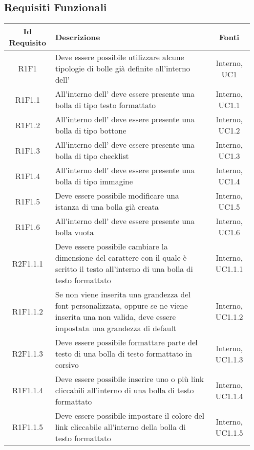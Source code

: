 \newpage
\subsection{Requisiti Funzionali}
\normalsize
\begingroup
\renewcommand\arraystretch{2}
\begin{longtable}{|c|>{\centering}m{7cm}|c|}
\hline
\textbf{Id Requisito} & \textbf{Descrizione} & \textbf{Fonti}\\
\hline
\endhead
			R1F1 & Deve essere possibile utilizzare alcune tipologie di bolle già definite all'interno dell'\termine{SDK} & Interno, UC1 \\
			\hline
			R1F1.1 & All'interno dell'\termine{SDK} deve essere presente una bolla di tipo testo formattato & Interno, UC1.1 \\
			\hline
			R1F1.2 & All'interno dell'\termine{SDK} deve essere presente una bolla di tipo bottone & Interno, UC1.2 \\ 
			\hline
			R1F1.3 & All'interno dell'\termine{SDK} deve essere presente una bolla di tipo checklist & Interno, UC1.3 \\ 
			\hline
			R1F1.4 & All'interno dell'\termine{SDK} deve essere presente una bolla di tipo immagine & Interno, UC1.4 \\ 
			\hline
			R1F1.5 & Deve essere possibile modificare una istanza di una bolla già creata & Interno, UC1.5 \\ 
			\hline
			R1F1.6 & All'interno dell'\termine{SDK} deve essere presente una bolla vuota & Interno, UC1.6 \\ 
			\hline
			R2F1.1.1 & Deve essere possibile cambiare la dimensione del carattere con il quale è scritto il testo all'interno di una bolla di testo formattato & Interno, UC1.1.1 \\
			\hline
			R1F1.1.2 & Se non viene inserita una grandezza del font personalizzata, oppure se ne viene inserita una non valida, deve essere impostata una grandezza di default & Interno, UC1.1.2\\
			\hline
			R2F1.1.3 & Deve essere possibile formattare parte del testo di una bolla di testo formattato in corsivo & Interno, UC1.1.3 \\
			\hline
			R1F1.1.4 & Deve essere possibile inserire uno o più link cliccabili all'interno di una bolla di testo formattato & Interno, UC1.1.4 \\
			\hline
			R1F1.1.5 & Deve essere possibile impostare il colore del link cliccabile all'interno della bolla di testo formattato & Interno, UC1.1.5 \\

\end{longtable}
